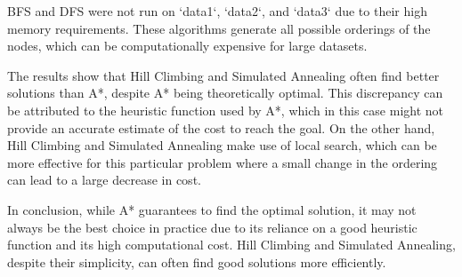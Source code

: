 \documentclass{article}
\begin{document}
BFS and DFS were not run on `data1`, `data2`, and `data3` due to their high memory requirements. These algorithms generate all possible orderings of the nodes, which can be computationally expensive for large datasets.

The results show that Hill Climbing and Simulated Annealing often find better solutions than A*, despite A* being theoretically optimal. This discrepancy can be attributed to the heuristic function used by A*, which in this case might not provide an accurate estimate of the cost to reach the goal. On the other hand, Hill Climbing and Simulated Annealing make use of local search, which can be more effective for this particular problem where a small change in the ordering can lead to a large decrease in cost.

In conclusion, while A* guarantees to find the optimal solution, it may not always be the best choice in practice due to its reliance on a good heuristic function and its high computational cost. Hill Climbing and Simulated Annealing, despite their simplicity, can often find good solutions more efficiently.
\end{document}
